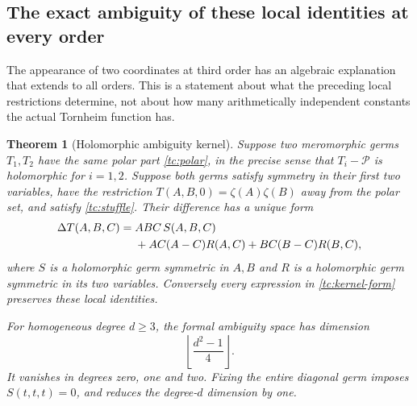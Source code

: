 \documentclass[11pt,a4paper]{article}
\numberwithin{equation}{section}
\theoremstyle{plain}
\newtheorem{theorem}{Theorem}[section]
\theoremstyle{definition}
\theoremstyle{remark}
\begin{document}
\subsection{The exact ambiguity of these local identities at every order}

The appearance of two coordinates at third order has an algebraic
explanation that extends to all orders.  This is a statement about
what the preceding local restrictions determine, not about how many
arithmetically independent constants the actual Tornheim function has.

\begin{theorem}[Holomorphic ambiguity kernel]
\label{tc:kernel}
Suppose two meromorphic germs $T_1,T_2$ have the same polar part
\eqref{tc:polar}, in the precise sense that $T_i-\mathscr P$ is
holomorphic for $i=1,2$. Suppose both germs satisfy symmetry in their first two variables, have
the restriction $T(A,B,0)=\zeta(A)\zeta(B)$ away from the polar set,
and satisfy \eqref{tc:stuffle}.  Their difference has a unique form
\begin{align}
 \Delta T(A,B,C)={}&ABC\,S(A,B,C)\notag\\
 &+AC(A-C)R(A,C)+BC(B-C)R(B,C),
 \label{tc:kernel-form}
\end{align}
where $S$ is a holomorphic germ symmetric in $A,B$ and $R$ is a
holomorphic germ symmetric in its two variables.  Conversely every
expression in \eqref{tc:kernel-form} preserves these local identities.

For homogeneous degree $d\ge3$, the formal ambiguity space has
dimension
\begin{equation}
 \left\lfloor\frac{d^2-1}{4}\right\rfloor.
 \label{tc:kernel-dimension}
\end{equation}
It vanishes in degrees zero, one and two.  Fixing the entire diagonal
germ imposes $S(t,t,t)=0$, and reduces the degree-$d$ dimension by one.
\end{theorem}
\end{document}
